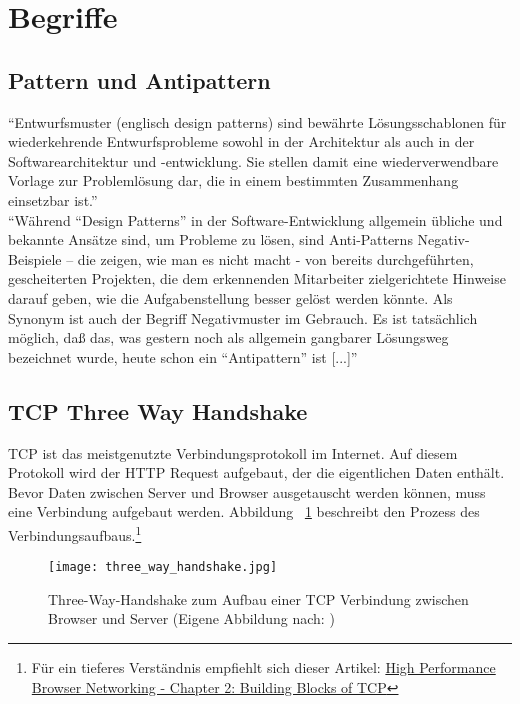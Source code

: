 
\section{Begriffe}
\label{sec:begriffe}
	\subsection{Pattern und Antipattern} %
	\label{sub:pattern_und_anti_pattern}
		"`Entwurfsmuster (englisch design patterns) sind bewährte Lösungsschablonen für wiederkehrende Entwurfsprobleme sowohl in der Architektur als auch in der Softwarearchitektur und -entwicklung. Sie stellen damit eine wiederverwendbare Vorlage zur Problemlösung dar, die in einem bestimmten Zusammenhang einsetzbar ist."'\autocite{pattern15}
		\\

		"`Während "`Design Patterns"' in der Software-Entwicklung allgemein übliche und bekannte Ansätze sind, um Probleme zu lösen, sind Anti-Patterns Negativ-Beispiele – die zeigen, wie man es nicht macht - von bereits durchgeführten, gescheiterten Projekten, die dem erkennenden Mitarbeiter zielgerichtete Hinweise darauf geben, wie die Aufgabenstellung besser gelöst werden könnte. Als Synonym ist auch der Begriff Negativmuster im Gebrauch. Es ist tatsächlich möglich, daß das, was gestern noch als allgemein gangbarer Lösungsweg bezeichnet wurde, heute schon ein "`Antipattern"' ist [...]"' \autocite{Stepken06}


	

	\subsection{TCP Three Way Handshake}
	\label{sub:tcp_three_way_handshake}
		TCP ist das meistgenutzte Verbindungsprotokoll im Internet. Auf diesem Protokoll wird der HTTP Request aufgebaut, der die eigentlichen Daten enthält.
		Bevor Daten zwischen Server und Browser ausgetauscht werden können, muss eine Verbindung aufgebaut werden. Abbildung ~\ref{fig:three_way_handshake} beschreibt den Prozess des Verbindungsaufbaus.\footnote{Für ein tieferes Verständnis empfiehlt sich dieser Artikel: \href{http://chimera.labs.oreilly.com/books/1230000000545/ch02.html}{High Performance Browser Networking - Chapter 2: Building Blocks of TCP}} 

		\begin{figure}[htbp]
			\begin{center}
				\texttt{[image: three\_way\_handshake.jpg]}
				\caption{Three-Way-Handshake zum Aufbau einer TCP Verbindung zwischen Browser und Server (Eigene Abbildung nach: \autocite{bos})}
				\label{fig:three_way_handshake}
			\end{center}
		\end{figure}

